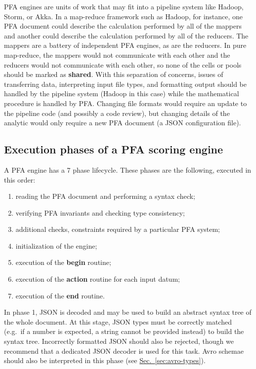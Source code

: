 \documentclass{article}
\newcommand{\PFAc}{\ttfamily\bfseries}
\theoremstyle{definition}
\begin{document}
PFA engines are units of work that may fit into a pipeline system like Hadoop, Storm, or Akka.  In a map-reduce framework such as Hadoop, for instance, one PFA document could describe the calculation performed by all of the mappers and another could describe the calculation performed by all of the reducers.  The mappers are a battery of independent PFA engines, as are the reducers.  In pure map-reduce, the mappers would not communicate with each other and the reducers would not communicate with each other, so none of the cells or pools should be marked as {\PFAc shared}.  With this separation of concerns, issues of transferring data, interpreting input file types, and formatting output should be handled by the pipeline system (Hadoop in this case) while the mathematical procedure is handled by PFA.  Changing file formats would require an update to the pipeline code (and possibly a code review), but changing details of the analytic would only require a new PFA document (a JSON configuration file).

\hypertarget{hsec:phases}{}
\subsection{Execution phases of a PFA scoring engine}
\label{sec:phases}

A PFA engine has a 7 phase lifecycle.  These phases are the following, executed in this order:

\begin{enumerate}
\item reading the PFA document and performing a syntax check;
\item verifying PFA invariants and checking type consistency;
\item additional checks, constraints required by a particular PFA system;
\item initialization of the engine;
\item execution of the {\PFAc begin} routine;
\item execution of the {\PFAc action} routine for each input datum;
\item execution of the {\PFAc end} routine.
\end{enumerate}

In phase 1, JSON is decoded and may be used to build an abstract syntax tree of the whole document.  At this stage, JSON types must be correctly matched (e.g.\ if a number is expected, a string cannot be provided instead) to build the syntax tree.  Incorrectly formatted JSON should also be rejected, though we recommend that a dedicated JSON decoder is used for this task.  Avro schemae should also be interpreted in this phase (see \hyperlink{hsec:avro-types}{Sec.~\ref{sec:avro-types}}).
\end{document}
